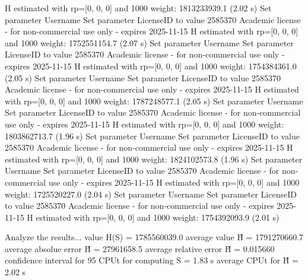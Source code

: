   H estimated with rp=[0, 0, 0] and 1000 weight:  1813233939.1  (2.02 s)
Set parameter Username
Set parameter LicenseID to value 2585370
Academic license - for non-commercial use only - expires 2025-11-15
  H estimated with rp=[0, 0, 0] and 1000 weight:  1752551154.7  (2.07 s)
Set parameter Username
Set parameter LicenseID to value 2585370
Academic license - for non-commercial use only - expires 2025-11-15
  H estimated with rp=[0, 0, 0] and 1000 weight:  1754384361.0  (2.05 s)
Set parameter Username
Set parameter LicenseID to value 2585370
Academic license - for non-commercial use only - expires 2025-11-15
  H estimated with rp=[0, 0, 0] and 1000 weight:  1787248577.1  (2.05 s)
Set parameter Username
Set parameter LicenseID to value 2585370
Academic license - for non-commercial use only - expires 2025-11-15
  H estimated with rp=[0, 0, 0] and 1000 weight:  1803862713.7  (1.96 s)
Set parameter Username
Set parameter LicenseID to value 2585370
Academic license - for non-commercial use only - expires 2025-11-15
  H estimated with rp=[0, 0, 0] and 1000 weight:  1824102573.8  (1.96 s)
Set parameter Username
Set parameter LicenseID to value 2585370
Academic license - for non-commercial use only - expires 2025-11-15
  H estimated with rp=[0, 0, 0] and 1000 weight:  1725520227.0  (2.04 s)
Set parameter Username
Set parameter LicenseID to value 2585370
Academic license - for non-commercial use only - expires 2025-11-15
  H estimated with rp=[0, 0, 0] and 1000 weight:  1754392093.9  (2.01 s)

Analyze the results...
  value H(S)                  = 1785560039.0 
  average value H̃             = 1791270660.7 
  average absolue error H̃     = 27961658.5 
  average relative error H̃    = 0.015660 
  confidence interval for 95%
  CPUt for computing S         = 1.83 s
  average CPUt for H̃           = 2.02 s

